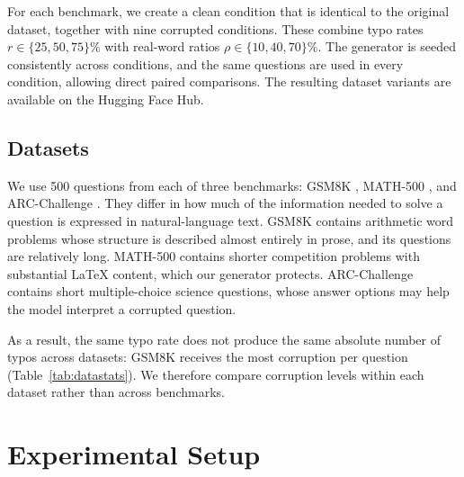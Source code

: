 \documentclass[11pt]{article}
\begin{document}
For each benchmark, we create a clean condition that is identical to the
original dataset, together with nine corrupted conditions. These combine typo
rates $r \in \{25, 50, 75\}\%$ with real-word ratios
$\rho \in \{10, 40, 70\}\%$. The generator is seeded consistently across
conditions, and the same questions are used in every condition, allowing direct
paired comparisons. The resulting dataset variants are available on the Hugging
Face Hub.

\subsection{Datasets}

We use 500 questions from each of three benchmarks: GSM8K \citep{cobbe2021},
MATH-500 \citep{hendrycks2021,lightman2024}, and ARC-Challenge
\citep{clark2018}. They differ in how much of the information needed to solve a
question is expressed in natural-language text. GSM8K contains arithmetic word
problems whose structure is described almost entirely in prose, and its
questions are relatively long. MATH-500 contains shorter competition problems
with substantial \LaTeX{} content, which our generator protects. ARC-Challenge
contains short multiple-choice science questions, whose answer options may help
the model interpret a corrupted question.

As a result, the same typo rate does not produce the same absolute number of
typos across datasets: GSM8K receives the most corruption per question
(Table~\ref{tab:datastats}). We therefore compare corruption levels within each
dataset rather than across benchmarks.

\begin{table}[tbp]
\centering
\footnotesize
\setlength{\tabcolsep}{3.5pt}

\caption{Dataset and corruption statistics over the nine corrupted conditions
($r\in\{25,50,75\}\%$, $\rho\in\{10,40,70\}\%$), first 500 questions of GSM8K
and ARC-Challenge and all of MATH-500. \emph{Eligible words} are those the
generator may corrupt, after protected spans, single-character words and
function words are removed; the typo rate applies to them, and real-word ratios
are pooled over all corrupted words.}
\label{tab:datastats}
\end{table}

\section{Experimental Setup}
\label{sec:setup}
\end{document}
